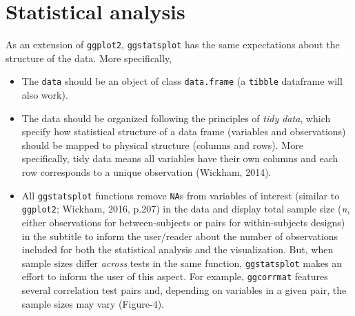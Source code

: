 \documentclass[]{article}
\begin{document}
\hypertarget{statistical-analysis}{%
\section{Statistical analysis}\label{statistical-analysis}}

As an extension of \texttt{ggplot2}, \texttt{ggstatsplot} has the same
expectations about the structure of the data. More specifically,

\begin{itemize}
\item
  The \texttt{data} should be an object of class \texttt{data.frame} (a
  \texttt{tibble} dataframe will also work).
\item
  The data should be organized following the principles of \emph{tidy
  data}, which specify how statistical structure of a data frame
  (variables and observations) should be mapped to physical structure
  (columns and rows). More specifically, tidy data means all variables
  have their own columns and each row corresponds to a unique
  observation (Wickham, 2014).
\item
  All \texttt{ggstatsplot} functions remove \texttt{NA}s from variables
  of interest (similar to \texttt{ggplot2}; Wickham, 2016, p.207) in the
  data and display total sample size (\emph{n}, either observations for
  between-subjects or pairs for within-subjects designs) in the subtitle
  to inform the user/reader about the number of observations included
  for both the statistical analysis and the visualization. But, when
  sample sizes differ \emph{across} tests in the same function,
  \texttt{ggstatsplot} makes an effort to inform the user of this
  aspect. For example, \texttt{ggcorrmat} features several correlation
  test pairs and, depending on variables in a given pair, the sample
  sizes may vary (Figure-4).
\end{itemize}
\end{document}
